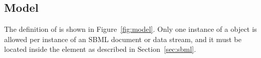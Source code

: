 %
%
%
%
%
%


\subsection{Model}
\label{sec:model}

The definition of \Model is shown in Figure~\vref{fig:model}.
Only one instance of a \Model object is allowed per instance of an
SBML \thisLV document or data stream, and it must be located
inside the  element as described in
Section~\ref{sec:sbml}.

